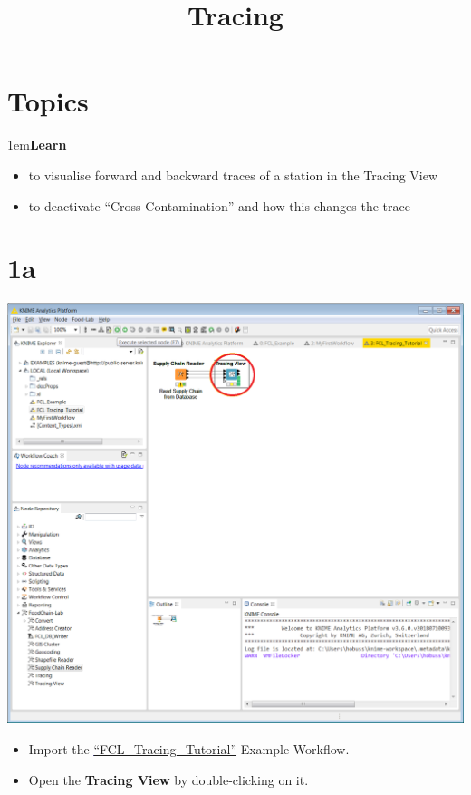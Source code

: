 \documentclass[10pt]{beamer}
\title{Tracing}
\date{}
\begin{document}
\maketitle

\section{Topics}
\begin{frame}
\leftskip1em\textbf{Learn}
	\begin{itemize}
		\item to visualise forward and backward traces of a station in the Tracing View
		\item to deactivate “Cross Contamination” and how this changes the trace
	\end{itemize}
\end{frame}

\section{1a}
\begin{frame}
	\begin{center}
  		\includegraphics[height=0.6\textheight]{1a.png}
	\end{center}
	\begin{itemize}
		\item Import the  \textcolor{blue}{\underline{\href{https://github.com/SiLeBAT/BfROpenLabResources/raw/master/GitHubPages/workflows/FCL\_Tracing\_Tutorial.knwf}{``FCL\_Tracing\_Tutorial''}}} Example Workflow.
		\item Open the \textbf{Tracing View} by double-clicking on it.
	\end{itemize}
\end{frame}
\end{document}
